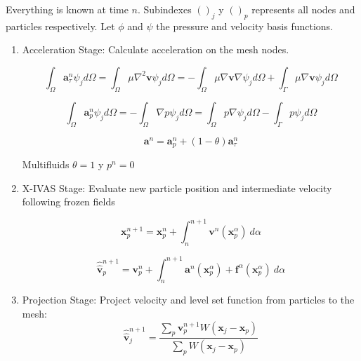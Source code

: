 \documentclass[a4paper,conference]{IEEEtran}
\begin{document}
Everything is known at time $n$. Subindexes $()_j$ y $()_p$ represents all nodes and particles respectively. Let $\phi$ and $\psi$ the pressure and velocity basis functions.

\begin{enumerate}
  \item Acceleration Stage: Calculate acceleration on the mesh nodes.


  \begin{equation}\label{Step1a}
\int_{\Omega}\mathbf{a}^{n}_{\tau}\psi_j d\Omega=\int_{\Omega}\mu \nabla^{2}\mathbf{v} \psi_j d\Omega=-\int_{\Omega}\mu \nabla\mathbf{v} \nabla \psi_j d\Omega + \int_{\Gamma}\mu \nabla\mathbf{v} \psi_j d\Omega
\end{equation}

\begin{equation}\label{Step1b}
\int_{\Omega}\mathbf{a}^{n}_{p}\psi_j d\Omega=-\int_{\Omega}\nabla p \psi_j d\Omega=\int_{\Omega} p \nabla \psi_j d\Omega - \int_{\Gamma} p \psi_j d\Omega
\end{equation}

\begin{equation}\label{Step1c}
\mathbf{a}^{n}=\mathbf{a}^{n}_{p} + (1-\theta)\mathbf{a}^{n}_{\tau}
\end{equation}

Multifluids $\theta=1$ y $p^n=0$

  \item X-IVAS Stage: Evaluate new particle position and intermediate velocity following frozen fields

  \begin{equation}\label{Step2a}
\mathbf{x}^{n+1}_{p}=\mathbf{x}^{n}_{p} + \int_{n}^{n+1} \mathbf{v}^{n}(\mathbf{x}^{\alpha}_{p}) \ d\alpha
\end{equation}

\begin{equation}\label{Step2b}
\widehat{\widehat{\mathbf{v}}}^{n+1}_{p}=\mathbf{v}^{n}_{p} + \int_{n}^{n+1} \mathbf{a}^{n}(\mathbf{x}^{\alpha}_{p}) + \mathbf{f}^{\alpha} (\mathbf{x}^{\alpha}_{p})  \ d\alpha
\end{equation}

  \item Projection Stage: Project velocity and level set function from particles to the mesh:
  \begin{equation}\label{Step3a}
\displaystyle \widehat{\widehat{\mathbf{v}}}^{n+1}_{j}=\frac{\sum_{p} \mathbf{v}^{n+1}_{p} W(\mathbf{x}_{j}-\mathbf{x}_{p})}{\sum_{p} W(\mathbf{x}_{j}-\mathbf{x}_{p})}
\end{equation}


\end{enumerate}
\end{document}
